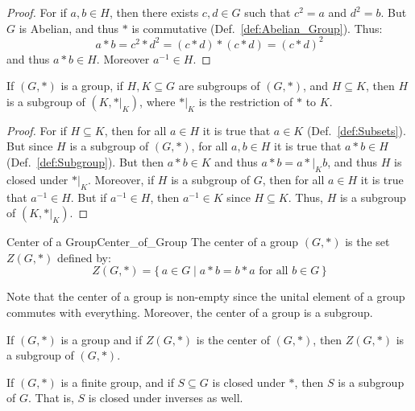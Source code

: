        \begin{proof}
            For if $a,b\in{H}$, then there exists $c,d\in{G}$ such that
            $c^{2}=a$ and $d^{2}=b$. But $G$ is Abelian, and thus $*$ is
            commutative (Def.~\ref{def:Abelian_Group}). Thus:
            \begin{equation}
                a*b=c^{2}*d^{2}=(c*d)*(c*d)=(c*d)^{2}
            \end{equation}
            and thus $a*b\in{H}$. Moreover $a^{\minus{1}}\in{H}$.
        \end{proof}
        \begin{theorem}
            If $(G,*)$ is a group, if $H,K\subseteq{G}$ are subgroups of
            $(G,*)$, and $H\subseteq{K}$, then $H$ is a subgroup of
            $(K,*|_{K})$, where $*|_{K}$ is the restriction of $*$ to $K$.
        \end{theorem}
        \begin{proof}
            For if $H\subseteq{K}$, then for all $a\in{H}$ it is true that
            $a\in{K}$ (Def.~\ref{def:Subsets}). But since $H$ is a subgroup of
            $(G,*)$, for all $a,b\in{H}$ it is true that $a*b\in{H}$
            (Def.~\ref{def:Subgroup}). But then $a*b\in{K}$ and thus
            $a*b=a*|_{K}b$, and thus $H$ is closed under $*|_{K}$. Moreover, if
            $H$ is a subgroup of $G$, then for all $a\in{H}$ it is true that
            $a^{\minus{1}}\in{H}$. But if $a^{\minus{1}}\in{H}$, then
            $a^{\minus{1}}\in{K}$ since $H\subseteq{K}$. Thus, $H$ is a subgroup
            of $(K,*|_{K})$.
        \end{proof}
        \begin{fdefinition}{Center of a Group}{Center_of_Group}
            The center of a group $(G,*)$ is the set $Z(G,*)$ defined by:
            \begin{equation*}
                Z(G,*)=\{\,a\in{G}\;|\;a*b=b*a\textrm{ for all }b\in{G}\,\}
            \end{equation*}
        \end{fdefinition}
        Note that the center of a group is non-empty since the unital element
        of a group commutes with everything. Moreover, the center of a group is
        a subgroup.
        \begin{theorem}
            If $(G,*)$ is a group and if $Z(G,*)$ is the center of $(G,*)$, then
            $Z(G,*)$ is a subgroup of $(G,*)$.
        \end{theorem}
        \begin{theorem}
            If $(G,*)$ is a finite group, and if $S\subseteq{G}$ is closed under
            $*$, then $S$ is a subgroup of $G$. That is, $S$ is closed under
            inverses as well.
        \end{theorem}
